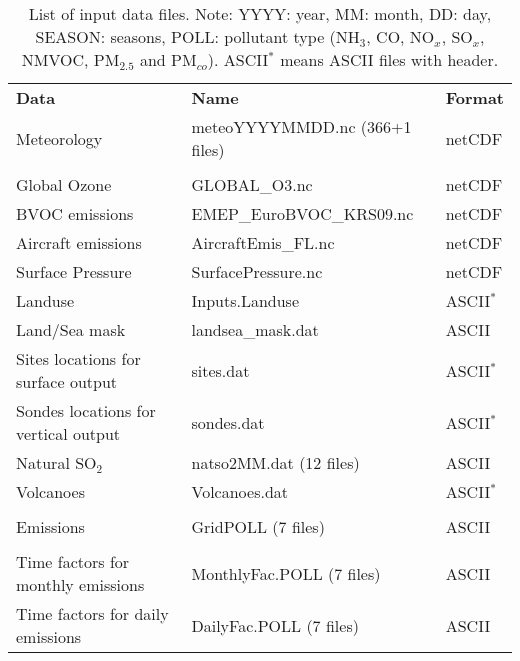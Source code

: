 \begin{table}
\caption[List of input data files]{List of input data files.
Note: YYYY: year, MM: month, DD: day, SEASON: seasons, POLL: pollutant
type (NH$_3$, CO, NO$_x$, SO$_x$, NMVOC,
PM$_{2.5}$ and PM$_{co}$). ASCII$^*$ means ASCII files with header.
\label{Tab:inputdata}}
\begin{center}
\begin{small}
\hspace{-1cm}
\begin{tabular}{lll}
 && \\
\hline
{\bf Data} &  {\bf Name} & {\bf Format}\\
\hline\hline
\hline
Meteorology  &  meteoYYYYMMDD.nc \quad (366+1 files) & netCDF\\
& & \\
Global Ozone & GLOBAL\_O3.nc & netCDF\\
BVOC emissions & EMEP\_EuroBVOC\_KRS09.nc & netCDF\\
Aircraft emissions & AircraftEmis\_FL.nc & netCDF \\
Surface Pressure & SurfacePressure.nc & netCDF \\
Landuse & Inputs.Landuse & ASCII$^*$\\
Land/Sea mask & landsea\_mask.dat & ASCII\\
Sites locations for surface output & sites.dat & ASCII$^*$\\
Sondes locations for vertical output & sondes.dat & ASCII$^*$\\
Natural SO$_2$ & natso2MM.dat  \quad (12 files) & ASCII\\
Volcanoes & Volcanoes.dat & ASCII$^*$\\
 && \\
Emissions & GridPOLL  \quad (7 files) & ASCII\\
 && \\
Time factors for monthly emissions& MonthlyFac.POLL  \quad (7 files) & ASCII\\
Time factors for daily emissions &  DailyFac.POLL  \quad (7 files)
& ASCII\\

\end{tabular}
\end{small}
\end{center}
\end{table}
